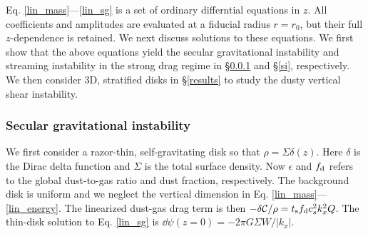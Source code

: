 
Eq. \ref{lin_mass}---\ref{lin_sg} is a set of ordinary
differntial equations in $z$. All coefficients and amplitudes are
evaluated at a fiducial radius $r=r_0$, but their full $z$-dependence
is retained. We next discuss solutions to these equations.  We first
show that the above equations yield the secular
gravitational instability and streaming instability in the strong
drag regime in \S\ref{sgi} and \S\ref{si}, respectively. We then
consider 3D, stratified disks in \S\ref{results} to study the dusty
vertical shear instability.

 




\subsubsection{Secular gravitational instability}\label{sgi}
We first consider a razor-thin, self-gravitating disk so that $\rho =
\Sigma\delta(z)$. Here $\delta$ is the Dirac delta function and $\Sigma$ is
the total surface density. Now $\epsilon$ and 
$f_\mathrm{d}$ refers to the global dust-to-gas ratio and dust 
fraction, respectively. The background disk is
uniform and we neglect the vertical dimension   
in Eq. \ref{lin_mass}---\ref{lin_energy}. The linearized dust-gas drag
term is then $-\delta\mathcal{C}/\rho = t_\mathrm{s}f_\mathrm{d} c_s^2k_x^2
Q$. The thin-disk solution to Eq. \ref{lin_sg} is $\dd\psi(z=0) = -2\pi G
\Sigma W/\left|k_x\right|$.%

